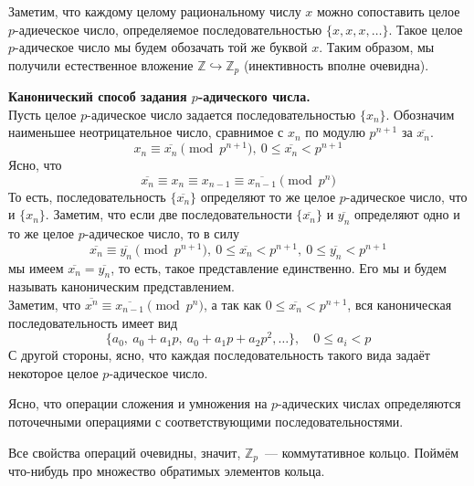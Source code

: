 \documentclass[11pt]{article}
\begin{document}
    Заметим, что каждому целому рациональному числу $x$ можно сопоставить целое $p$-адиеческое число, определяемое последовательностью
    $\{ x, x, x, \ldots \}$. Такое целое $p$-адическое число мы будем обозачать той же буквой $x$. Таким образом, мы получили естественное
    вложение $\mathbb{Z} \hookrightarrow \mathbb{Z}_p$ (инективность вполне очевидна).

    \begin{remark} \textbf{Канонический способ задания $p$-адического числа.}\\
        Пусть целое $p$-адическое число задается последовательностью $\{ x_n \}$. Обозначим наименьшее неотрицательное
        число, сравнимое с $x_n$ по модулю $p^{n + 1}$ за $\overline{x_n}$.
        \[ x_n \equiv \overline{x_n} \pmod{p^{n + 1}}, \ 0 \le \overline{x_n} < p^{n + 1} \]
        Ясно, что
        \[ \overline{x_n} \equiv x_n \equiv x_{n - 1} \equiv \overline{x_{n - 1}} \pmod{p^n}\]
        То есть, последовательность $\{ \overline{x_n} \}$ определяют то же целое $p$-адическое число, что и $\{ x_n \}$.
        Заметим, что если две последовательности $\{ \overline{x_n} \}$ и $\overline{y_n}$ определяют одно и то же целое $p$-адическое число, то
        в силу
        \[ \overline{x_n} \equiv \overline{y_n} \pmod{p^{n + 1}}, \ 0 \le \overline{x_n} < p^{n + 1}, \ 0 \le \overline{y_n} < p^{n + 1}\]
        мы имеем $\overline{x_n} = \overline{y_n}$, то есть, такое представление единственно. Его мы и будем называть каноническим представлением. \\


        Заметим, что $\overline{x^n} \equiv \overline{x_{n - 1}} \pmod{p^n}$, а так как $0 \le \overline{x_n} < p^{n + 1}$, вся каноническая
        последовательность имеет вид
        \[ \{ a_0, \ a_0 + a_1 p, \ a_0 + a_1 p + a_2 p^2, \ldots \}, \quad 0 \le a_i < p \]
        С другой стороны, ясно, что каждая последовательность такого вида задаёт некоторое целое $p$-адическое число.
    \end{remark}

    Ясно, что операции сложения и умножения на $p$-адических числах определяются поточечными операциями с соответствующими
    последовательностями.

    Все свойства операций очевидны, значит, $\mathbb{Z}_p$~--- коммутативное кольцо. Поймём что-нибудь про множество обратимых элементов кольца.
\end{document}

